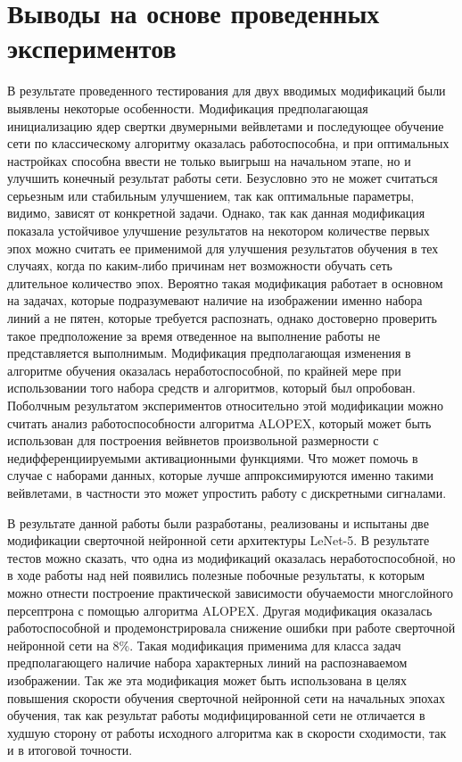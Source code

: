 \documentclass[utf8,usehyperref,14pt]{G7-32}
\begin{document}
\section{Выводы на основе проведенных экспериментов}
В результате проведенного тестирования для двух вводимых модификаций были выявлены некоторые особенности. 
Модификация предполагающая инициализацию ядер свертки двумерными вейвлетами и последующее обучение сети по классическому алгоритму оказалась работоспособна, и при оптимальных настройках способна ввести не только выигрыш на начальном этапе, но и улучшить конечный результат работы сети. Безусловно это не может считаться серьезным или стабильным улучшением, так как оптимальные параметры, видимо, зависят от конкретной задачи. Однако, так как данная модификация показала устойчивое улучшение результатов на некотором количестве первых эпох можно считать ее применимой для улучшения результатов обучения в тех случаях, когда по каким-либо причинам нет возможности обучать сеть длительное количество эпох. Вероятно такая модификация работает в основном на задачах, которые подразумевают наличие на изображении именно набора линий а не пятен, которые требуется распознать, однако достоверно проверить такое предположение за время отведенное на выполнение работы не представляется выполнимым.
Модификация предполагающая изменения в алгоритме обучения оказалась неработоспособной, по крайней мере при использовании того набора средств и алгоритмов, который был опробован. Поболчным результатом экспериментов относительно этой модификации можно считать анализ работоспособности алгоритма ALOPEX, который может быть использован для построения вейвнетов произвольной размерности с недифференциируемыми активационными функциями. Что может помочь в случае с наборами данных, которые лучше аппроксимируются именно такими вейвлетами, в частности это может упростить работу с дискретными сигналами.

\backmatter %

\Conclusion %
В результате данной работы были разработаны, реализованы и испытаны две модификации сверточной нейронной сети архитектуры LeNet-5. В результате тестов можно сказать, что одна из модификаций оказалась неработоспособной, но в ходе работы над ней появились полезные побочные результаты, к которым можно отнести построение практической зависимости обучаемости многслойного персептрона с помощью алгоритма ALOPEX.
Другая модификация оказалась работоспособной и продемонстрировала снижение ошибки при работе сверточной нейронной сети на 8\%. Такая модификация применима для класса задач предполагающего наличие набора характерных линий на распознаваемом изображении. Так же эта модификация может быть использована в целях повышения скорости обучения сверточной нейронной сети на начальных эпохах обучения, так как результат работы модифицированной сети не отличается в худшую сторону от работы исходного алгоритма как в скорости сходимости, так и в итоговой точности.
\end{document}
